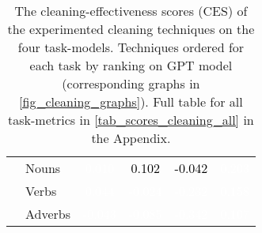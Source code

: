 \begin{table}[t]
{\begin{tabular}{c|lc|c|c|c}
    &
    Nouns &     \cellcolor[gray]{0.33} \textcolor{white}{0.010} &     \cellcolor[gray]{0.83} \textcolor{black}{0.102} &     \cellcolor[gray]{0.67} \textcolor{black}{-0.042} &     \cellcolor[gray]{0.33} \textcolor{white}{0.203} \\
    &
    Verbs &     \cellcolor[gray]{0.50} \textcolor{white}{0.044} &     \cellcolor[gray]{0.33} \textcolor{white}{-0.024} &     \cellcolor[gray]{0.33} \textcolor{white}{-0.232} &     \cellcolor[gray]{0.17} \textcolor{white}{0.158} \\
    &
    Adverbs &     \cellcolor[gray]{0.00} \textcolor{white}{-0.043} &     \cellcolor[gray]{0.00} \textcolor{white}{-0.085} &     \cellcolor[gray]{0.00} \textcolor{white}{-0.342} &     \cellcolor[gray]{0.00} \textcolor{white}{0.107} \\
    \bottomrule
    \end{tabular}%
    }
    \caption{The cleaning-effectiveness scores (CES) of the experimented cleaning techniques on the four task-models.
    Techniques ordered for each task by ranking on GPT model (corresponding graphs in \autoref{fig_cleaning_graphs}). Full table for all task-metrics in \autoref{tab_scores_cleaning_all} in the Appendix.}
    \label{tab_scores_cleaning}
\end{table}
